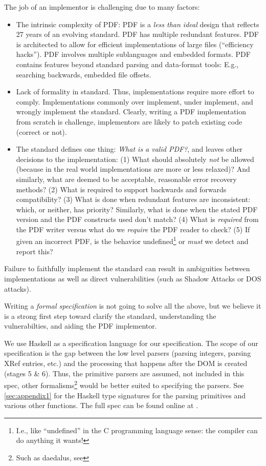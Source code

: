 The job of an implementor is challenging due to many factors:
\begin{itemize}
\item The intrinsic complexity of PDF:
  PDF is a \emph{less than ideal} design that reflects 27 years of
  an evolving standard.
  PDF has multiple redundant features.
  PDF is architected to allow for efficient implementations of
  large files (``efficiency hacks'').
  PDF involves multiple sublanguages and embedded formats.
  PDF contains features beyond standard parsing and data-format
  tools: E.g., searching backwards, embedded file offsets.
\item Lack of formality in standard. Thus, implementations
  require more effort to comply.
  Implementations commonly over implement, under implement,
  and wrongly implement the standard.
  Clearly, writing a PDF implementation from scratch is challenge,
  implementors are likely to patch existing code (correct or not).
\item The standard defines one thing: \emph{What is a valid PDF?},
  and leaves other decisions to the implementation:
  (1) What should absolutely \emph{not} be allowed (because in the real world
    implementations are more or less relaxed)? And similarly,
    what are deemed to be acceptable, reasonable error recovery methods?
  (2) What is required to support backwards and forwards compatibility?
  (3) What is done when redundant features are inconsistent: which, or
    neither, has priority?
    Similarly, what is done when the stated PDF version and the PDF
    constructs used don't match?
  (4) What is \emph{required} from the PDF writer versus
    what do we \emph{require} the PDF reader to check?
  (5) If given an incorrect PDF, is the behavior undefined\footnote{
      I.e., like ``undefined'' in the C programming language sense: the
      compiler can do anything it wants!
    } or \emph{must} we detect and report this?
\end{itemize}
Failure to faithfully implement the standard can result in ambiguities
between implementations as well as direct vulnerabilities (such as
Shadow Attacks or DOS attacks).

Writing a \emph{formal specification} is not going to solve all the above,
but we believe it is a strong first step toward clarify the
standard, understanding the vulnerabilties, and aiding the PDF implementor.

We use Haskell \cite{Haskell} as a specification language for
our specification.
%
The scope of our specification is the gap between the low
level parsers (parsing integers, parsing XRef entries, etc.) and the
processing that happens after the DOM is created (stages 5 \& 6).
%
Thus, the primitive parsers are assumed, not included in this spec,
other formalisms\footnote{Such as daedalus, see \todo{}
} would be better suited to specifying the parsers.
See \cref{sec:appendix1} for the Haskell type signatures for the
parsing primitives and various other functions.
%
The full spec can be found online at .

